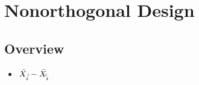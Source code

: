 \documentclass[11pt,fleqn]{book} %
\begin{document}






\chapter{Nonorthogonal Design}

\section{Overview}

\begin{itemize}
	\item $\bar{X_{i\dot\dot}} - \bar{X_{\dot\dot i}}$
\end{itemize}



\end{document}
